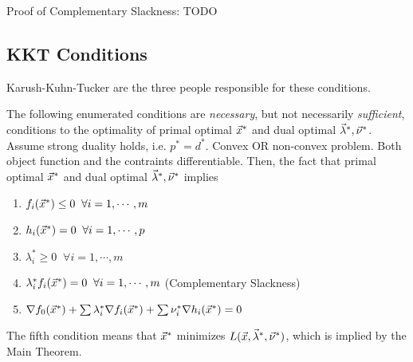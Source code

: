 Proof of Complementary Slackness: TODO


\subsection{KKT Conditions} %
\label{sub:kkt_conditions}

\begin{remark}
	Karush-Kuhn-Tucker are the three people responsible for these conditions.
\end{remark}

\begin{theorem}
	The following enumerated conditions are \textit{necessary}, but not necessarily \textit{sufficient}, conditions to the optimality of primal optimal $\vec{x}^*$ and dual optimal $\vec{\lambda}^*, \vec{\nu}^*$. Assume strong duality holds, i.e. $p^*=d^*$. Convex OR non-convex problem. Both object function and the contraints differentiable. Then, the fact that primal optimal $\vec{x}^*$ and dual optimal $\vec{\lambda}^*, \vec{\nu}^*$ implies
	\begin{enumerate}
		\item $f_i(\vec{x}^*) \le 0\;\; \forall i=1,\cdots,m$
		\item $h_i(\vec{x}^*) = 0\;\; \forall i=1,\cdots,p$
		\item $\lambda_i^* \ge 0 \;\; \forall i=1,\cdots,m$
		\item $\lambda_i^*f_i(\vec{x}^*) = 0 \;\; \forall i=1,\cdots,m$ (Complementary Slackness)
		\item $\nabla f_0(\vec{x}^*)+\sum \lambda_i^*\nabla f_i(\vec{x}^*) +\sum\nu_i^*\nabla h_i(\vec{x}^*) = 0$
	\end{enumerate}
	The fifth condition means that $\vec{x}^*$ minimizes $L(\vec{x},\vec{\lambda}^*,\vec{\nu}^*)$, which is implied by the Main Theorem.
\end{theorem}


